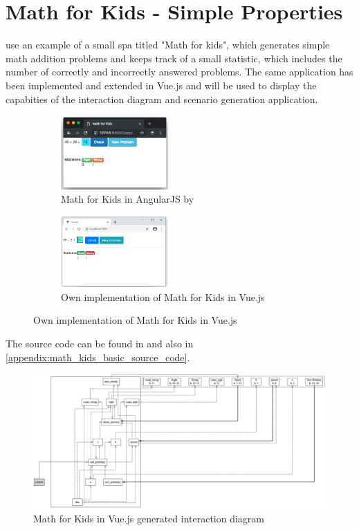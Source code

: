 \section{Math for Kids - Simple Properties}
\textcite{zhang2019scenario} use an example of a small \gls{spa} titled "Math for kids", which generates simple math addition problems and keeps track of a small statistic, which includes the number of correctly and incorrectly answered problems. The same application has been implemented and extended in Vue.js and will be used to display the capabities of the interaction diagram and scenario generation application.

\begin{figure}[H]
    \centering
    \begin{subfigure}[b]{0.45\textwidth}
         \centering
         \includegraphics[width=0.45\textwidth]{images/math_for_kids_zhang.png}
         \caption{Math for Kids in AngularJS by \textcite{zhang2019scenario}}
    \end{subfigure}\hfill%
    \begin{subfigure}[b]{0.45\textwidth}
        \centering
        \includegraphics[width=0.45\textwidth]{images/math_for_kids_own.png}
        \caption{Own implementation of Math for Kids in Vue.js}
    \end{subfigure}
\end{figure}

The source code can be found in  and also in \ref{appendix:math_kids_basic_source_code}.
\begin{figure}[H]
    \includegraphics[width=\textwidth]{images/diagram_own_math_kids.png}
     \caption{Math for Kids in Vue.js generated interaction diagram }
     \label{fig:math_for_kids_own_interaction_diagram}
\end{figure}

